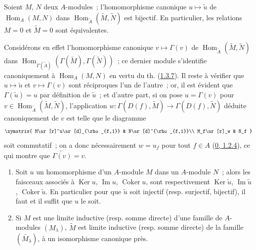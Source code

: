 \begin{corollary}[1.3.8]
\label{I.1.3.8-fr}
Soient $M$, $N$ deux $A$-modules~; l'homomorphisme canonique
$u\mapsto\widetilde{u}$ de $\operatorname{Hom}_A(M,N)$ dans
$\operatorname{Hom}_{\widetilde{A}}(\widetilde{M},\widetilde{N})$ est
bijectif. En particulier, les relations $M=0$ et $\widetilde{M}=0$ sont
équivalentes.
\end{corollary}

Considérons en effet l'homomorphisme canonique $v\mapsto\Gamma(v)$ de
$\operatorname{Hom}_{\widetilde{A}}(\widetilde{M},\widetilde{N})$ dans
$\operatorname{Hom}_{\Gamma(\widetilde{A})}
(\Gamma(\widetilde{M}),\Gamma(\widetilde{N}))$~; ce dernier module s'identifie
canoniquement à $\operatorname{Hom}_A(M,N)$ en vertu du th.
(\hyperref[I.1.3.7-fr]{1.3.7}). Il reste à vérifier que
$u\mapsto\widetilde{u}$ et $v\mapsto\Gamma(v)$ sont réciproques l'un de
l'autre~; or, il est évident que $\Gamma(\widetilde{u})=u$ par définition de
$\widetilde{u}$~; et d'autre part, si on pose $u=\Gamma(v)$ pour
$v\in\operatorname{Hom}_{\widetilde{A}}(\widetilde{M},\widetilde{N})$,
l'application
$w:\Gamma(D(f),\widetilde{M})\to\Gamma(D(f),\widetilde{N})$ déduite
canoniquement de $v$ est telle que le diagramme
\[
  \xymatrix{
    M\ar[r]^u\ar[d]_{\rho_{f,1}} & N\ar[d]^{\rho_{f,1}}\\
    M_f\ar[r]_w & N_f
  }
\]
soit commutatif~; on a donc nécessairement $w=u_f$ pour tout $f\in A$
(\hyperref[0.1.2.4-fr]{0, 1.2.4}), ce qui montre que
$\widetilde{\Gamma(v)}=v$.

\begin{corollary}[1.3.9]
\label{I.1.3.9-fr}
\begin{enumerate}
  \item[\rm(i)] Soit $u$ un homomorphisme d'un $A$-module $M$ dans un
  $A$-module $N$~; alors les faisceaux associés à $\operatorname{Ker}u$,
  $\operatorname{Im}u$, $\operatorname{Coker}u$, sont respectivement
  $\operatorname{Ker}\widetilde{u}$, $\operatorname{Im}\widetilde{u}$,
  $\operatorname{Coker}\widetilde{u}$. En particulier pour que
  $\widetilde{u}$ soit injectif (resp. surjectif, bijectif), il faut et il
  suffit que $u$ le soit.
  \item[\rm(ii)] Si $M$ est une limite inductive (resp. somme directe) d'une
  famille de $A$-modules $(M_\lambda)$, $\widetilde{M}$ est limite inductive
  (resp. somme directe) de la famille $(\widetilde{M_\lambda})$, à un
  isomorphisme canonique près.
\end{enumerate}
\end{corollary}

